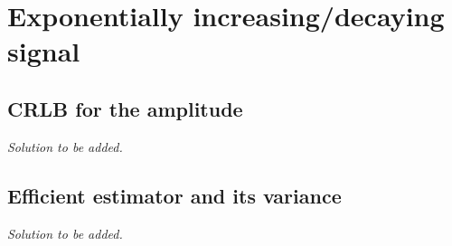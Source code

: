 \section{Exponentially increasing/decaying signal}

\subsection{CRLB for the amplitude}

\emph{Solution to be added.}

\subsection{Efficient estimator and its variance}

\emph{Solution to be added.}

